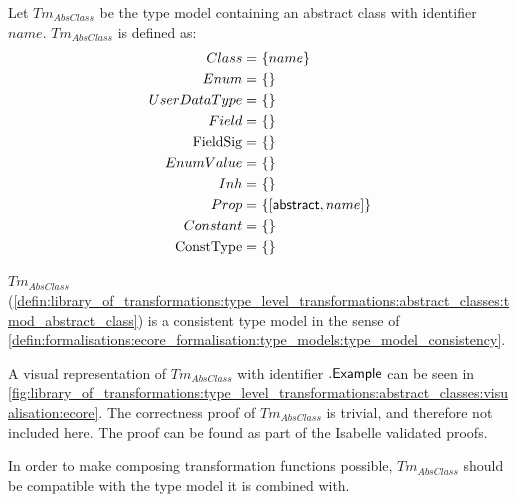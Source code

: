\begin{defin}
\label{defin:library_of_transformations:type_level_transformations:abstract_classes:tmod_abstract_class}
Let $Tm_{AbsClass}$ be the type model containing an abstract class with identifier $name$. $Tm_{AbsClass}$ is defined as:
\begin{align*}
Class =\ &\{name\} \\
Enum =\ &\{\} \\
UserDataType =\ &\{\} \\
Field =\ &\{\} \\
\mathrm{FieldSig} =\ &\{\} \\
EnumValue =\ &\{\} \\
Inh =\ &\{\} \\
Prop =\ &\{[ \mathsf{abstract}, name ]\} \\
Constant =\ &\{\} \\
\mathrm{ConstType} =\ &\{\}
\end{align*}
\end{defin}

\begin{thm}
\label{defin:library_of_transformations:type_level_transformations:abstract_classes:tmod_abstract_class_correct}
$Tm_{AbsClass}$ (\cref{defin:library_of_transformations:type_level_transformations:abstract_classes:tmod_abstract_class}) is a consistent type model in the sense of \cref{defin:formalisations:ecore_formalisation:type_models:type_model_consistency}.
\end{thm}

A visual representation of $Tm_{AbsClass}$ with identifier $.\mathsf{Example}$ can be seen in \cref{fig:library_of_transformations:type_level_transformations:abstract_classes:visualisation:ecore}. The correctness proof of $Tm_{AbsClass}$ is trivial, and therefore not included here. The proof can be found as part of the Isabelle validated proofs.

In order to make composing transformation functions possible, $Tm_{AbsClass}$ should be compatible with the type model it is combined with.

